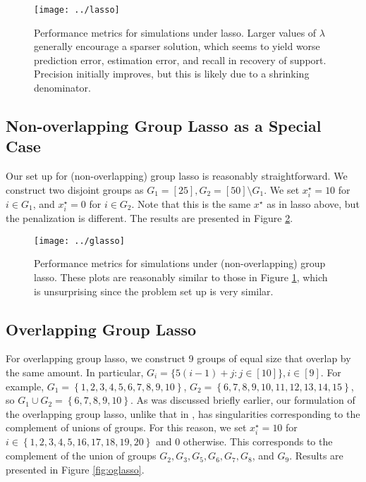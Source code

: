 \documentclass{article}
\begin{document}
\begin{figure}[h]
  \centering
  \texttt{[image: ../lasso]}
  \caption{Performance metrics for simulations under lasso. Larger values of $\lambda$ generally encourage a sparser solution, which seems to yield worse prediction error, estimation error, and recall in recovery of support. Precision initially improves, but this is likely due to a shrinking denominator.}
  \label{fig:lasso}
\end{figure}




\subsection{Non-overlapping Group Lasso as a Special Case}
\label{sec:non-overl-group}
Our set up for (non-overlapping) group lasso is reasonably straightforward.
We construct two disjoint groups as $G_1 = [25], G_2 = [50] \setminus G_1$.
We set $x^{\star}_i = 10$ for $i \in G_1$, and $x^{\star}_i = 0$ for $i \in G_2$.
Note that this is the same $x^{\star}$ as in lasso above, but the penalization is different.
The results are presented in Figure \ref{fig:glasso}.

\begin{figure}[h]
  \centering
  \texttt{[image: ../glasso]}
  \caption{Performance metrics for simulations under (non-overlapping) group lasso. These plots are reasonably similar to those in Figure \ref{fig:lasso}, which is unsurprising since the problem set up is very similar.}
  \label{fig:glasso}
\end{figure}

\subsection{Overlapping Group Lasso}
\label{sec:overl-group-lasso}
For overlapping group lasso, we construct 9 groups of equal size that overlap by the same amount.
In particular, $G_i = \{5(i-1) + j : j \in [10]\}, i \in [9]$.
For example, $G_1 = 
\left\{
  1, 2, 3, 4, 5, 6, 7, 8, 9, 10
\right\}$, $G_2 = 
\left\{
  6, 7, 8, 9, 10, 11, 12, 13, 14, 15
\right\}$, so $G_1 \cup G_2 = 
\left\{
  6, 7, 8, 9, 10
\right\}$.
As was discussed briefly earlier, our formulation of the overlapping group lasso, unlike that in \cite{jacob_group_2009,obozinski_group_2011}, has singularities corresponding to the complement of unions of groups.
For this reason, we set $x^{\star}_i = 10$ for $i \in 
\left\{
  1, 2, 3, 4, 5, 16, 17, 18, 19, 20
\right\}$ and 0 otherwise.
This corresponds to the complement of the union of groups $G_2, G_3, G_5, G_6, G_7, G_8$,  and $G_9$.
Results are presented in Figure \ref{fig:oglasso}.
\end{document}
